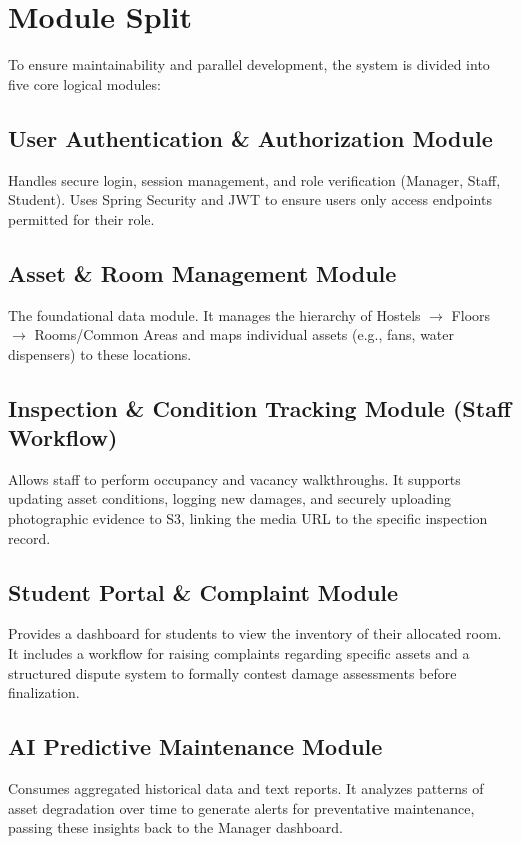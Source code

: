 \documentclass[11pt,a4paper]{article}
\begin{document}
\section{Module Split}
To ensure maintainability and parallel development, the system is divided into five core logical modules:

\subsection{User Authentication \& Authorization Module}
Handles secure login, session management, and role verification (Manager, Staff, Student). Uses Spring Security and JWT to ensure users only access endpoints permitted for their role.

\subsection{Asset \& Room Management Module}
The foundational data module. It manages the hierarchy of Hostels $\rightarrow$ Floors $\rightarrow$ Rooms/Common Areas and maps individual assets (e.g., fans, water dispensers) to these locations.

\subsection{Inspection \& Condition Tracking Module (Staff Workflow)}
Allows staff to perform occupancy and vacancy walkthroughs. It supports updating asset conditions, logging new damages, and securely uploading photographic evidence to S3, linking the media URL to the specific inspection record.

\subsection{Student Portal \& Complaint Module}
Provides a dashboard for students to view the inventory of their allocated room. It includes a workflow for raising complaints regarding specific assets and a structured dispute system to formally contest damage assessments before finalization.

\subsection{AI Predictive Maintenance Module}
Consumes aggregated historical data and text reports. It analyzes patterns of asset degradation over time to generate alerts for preventative maintenance, passing these insights back to the Manager dashboard.
\end{document}
